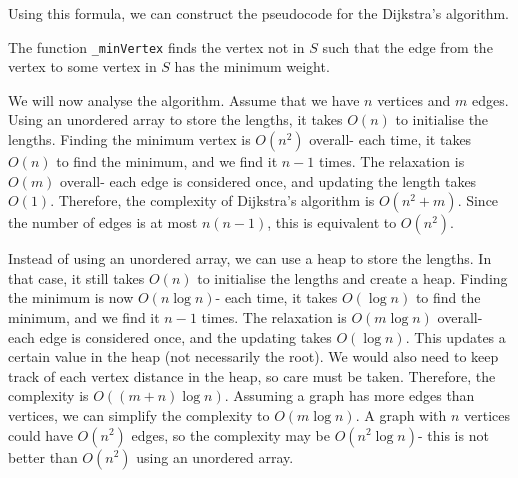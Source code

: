 \documentclass[a4paper, openany]{memoir}
\begin{document}
Using this formula, we can construct the pseudocode for the Dijkstra's algorithm.

The function \texttt{\_minVertex} finds the vertex not in $S$ such that the edge from the vertex to some vertex in $S$ has the minimum weight.

We will now analyse the algorithm. Assume that we have $n$ vertices and $m$ edges. Using an unordered array to store the lengths, it takes $O(n)$ to initialise the lengths. Finding the minimum vertex is $O(n^2)$ overall- each time, it takes $O(n)$ to find the minimum, and we find it $n-1$ times. The relaxation is $O(m)$ overall- each edge is considered once, and updating the length takes $O(1)$. Therefore, the complexity of Dijkstra's algorithm is $O(n^2 + m)$. Since the number of edges is at most $n(n-1)$, this is equivalent to $O(n^2)$.

Instead of using an unordered array, we can use a heap to store the lengths. In that case, it still takes $O(n)$ to initialise the lengths and create a heap. Finding the minimum is now $O(n \log n)$- each time, it takes $O(\log n)$ to find the minimum, and we find it $n-1$ times. The relaxation is $O(m \log n)$ overall- each edge is considered once, and the updating takes $O(\log n)$. This updates a certain value in the heap (not necessarily the root). We would also need to keep track of each vertex distance in the heap, so care must be taken. Therefore, the complexity is $O((m+n) \log n)$. Assuming a graph has more edges than vertices, we can simplify the complexity to $O(m \log n)$. A graph with $n$ vertices could have $O(n^2)$ edges, so the complexity may be $O(n^2 \log n)$- this is not better than $O(n^2)$ using an unordered array.
\end{document}
